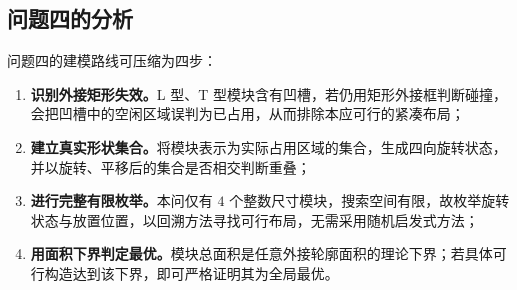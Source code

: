 \subsection{问题四的分析}

问题四的建模路线可压缩为四步：
\begin{enumerate}
  \item \textbf{识别外接矩形失效。}L 型、T 型模块含有凹槽，若仍用矩形外接框判断碰撞，会把凹槽中的空闲区域误判为已占用，从而排除本应可行的紧凑布局；
  \item \textbf{建立真实形状集合。}将模块表示为实际占用区域的集合，生成四向旋转状态，并以旋转、平移后的集合是否相交判断重叠；
  \item \textbf{进行完整有限枚举。}本问仅有 $4$ 个整数尺寸模块，搜索空间有限，故枚举旋转状态与放置位置，以回溯方法寻找可行布局，无需采用随机启发式方法；
  \item \textbf{用面积下界判定最优。}模块总面积是任意外接轮廓面积的理论下界；若具体可行构造达到该下界，即可严格证明其为全局最优。
\end{enumerate}
